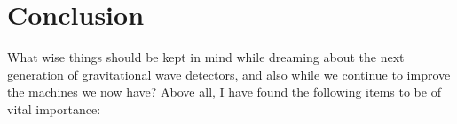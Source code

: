 %
%
%
%
%
%





\section{Conclusion}
What wise things should be kept in mind while dreaming about the next
generation of gravitational wave detectors, and also while we continue
to improve the machines we now have? Above all, I have found the
following items to be of vital importance:


